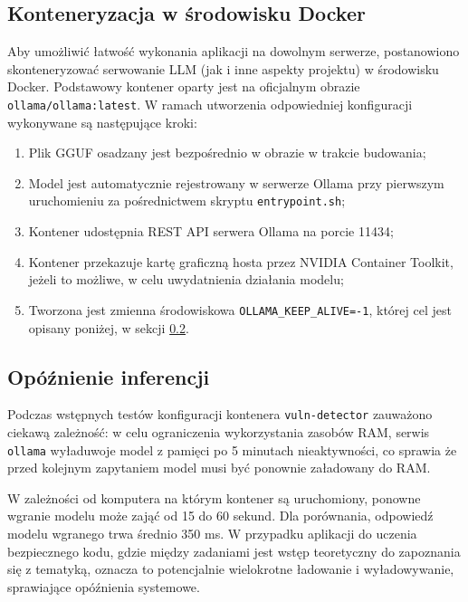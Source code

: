 \documentclass[12pt,a4paper]{article}
\begin{document}
\subsection{Konteneryzacja w środowisku Docker}

Aby umożliwić łatwość wykonania aplikacji na dowolnym serwerze, postanowiono skonteneryzować serwowanie LLM (jak i inne aspekty projektu) w środowisku Docker.
Podstawowy kontener oparty jest na oficjalnym obrazie \texttt{ollama/ollama:latest}. W ramach utworzenia odpowiedniej konfiguracji wykonywane są następujące kroki:

\begin{enumerate}
    \item Plik GGUF osadzany jest bezpośrednio w obrazie w trakcie budowania;
    \item Model jest automatycznie rejestrowany w serwerze Ollama przy pierwszym uruchomieniu za pośrednictwem skryptu \texttt{entrypoint.sh};
    \item Kontener udostępnia REST API serwera Ollama na porcie 11434;
    \item Kontener przekazuje kartę graficzną hosta przez NVIDIA Container Toolkit, jeżeli to możliwe, w celu uwydatnienia działania modelu;
    \item Tworzona jest zmienna środowiskowa \texttt{OLLAMA\_KEEP\_ALIVE=-1}, której cel jest opisany poniżej, w sekcji \ref{ssec:model_latency}.

\end{enumerate}

\subsection{Opóźnienie inferencji}
\label{ssec:model_latency}

Podczas wstępnych testów konfiguracji kontenera \texttt{vuln-detector} zauważono ciekawą zależność: w celu ograniczenia wykorzystania zasobów RAM, 
serwis \texttt{ollama} wyładuwoje model z pamięci po 5 minutach nieaktywności, co sprawia że przed kolejnym zapytaniem model musi być ponownie załadowany do RAM. 

W zależności od komputera na którym kontener są uruchomiony, ponowne wgranie modelu może zająć od 15 do 60 sekund. Dla porównania, 
odpowiedź modelu wgranego trwa średnio 350 ms.  W przypadku aplikacji do uczenia bezpiecznego kodu, gdzie między zadaniami jest wstęp teoretyczny do zapoznania się z tematyką,
oznacza to potencjalnie wielokrotne ładowanie i wyładowywanie, sprawiające opóźnienia systemowe.
\end{document}

